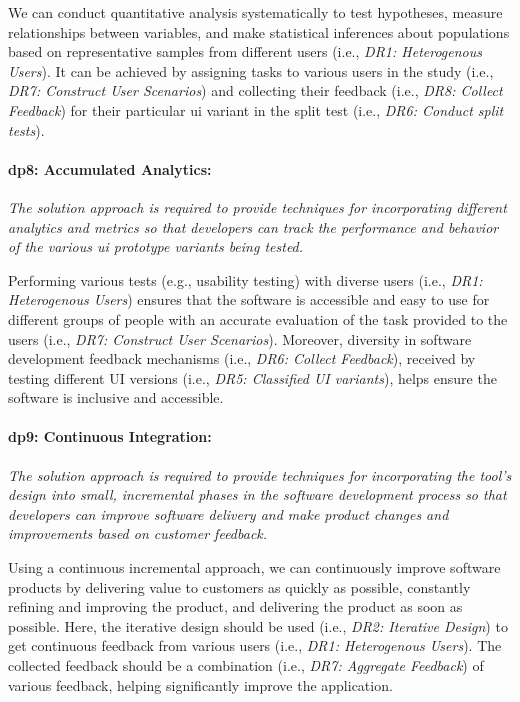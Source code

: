 We can conduct quantitative analysis systematically to test hypotheses, measure relationships between variables, and make statistical inferences about populations based on representative samples from different users (i.e., \textit{DR1: Heterogenous Users}).
It can be achieved by assigning tasks to various users in the study (i.e., \textit{DR7: Construct User Scenarios}) and collecting their feedback (i.e., \textit{DR8: Collect Feedback}) for their particular \ac{ui} variant in the split test (i.e., \textit{DR6: Conduct split tests}).

\paragraph{\ac{dp}8: Accumulated Analytics:} \textit{The solution approach is required to provide techniques for incorporating different analytics and metrics so that developers can track the performance and behavior of the various \ac{ui} prototype variants being tested.}

Performing various tests (e.g., usability testing) with diverse users (i.e., \textit{DR1: Heterogenous Users}) ensures that the software is accessible and easy to use for different groups of people with an accurate evaluation of the task provided to the users (i.e., \textit{DR7: Construct User Scenarios}).
Moreover, diversity in software development feedback mechanisms (i.e., \textit{DR6: Collect Feedback}), received by testing different UI versions (i.e., \textit{DR5: Classified UI variants}), helps ensure the software is inclusive and accessible.

\paragraph{\ac{dp}9: Continuous Integration:} \textit{The solution approach is required to provide techniques for incorporating the tool's design into small, incremental phases in the software development process so that developers can improve software delivery and make product changes and improvements based on customer feedback.}

Using a continuous incremental approach, we can continuously improve software products by delivering value to customers as quickly as possible, constantly refining and improving the product, and delivering the product as soon as possible.
Here, the iterative design should be used (i.e., \textit{DR2: Iterative Design}) to get continuous feedback from various users (i.e., \textit{DR1: Heterogenous Users}).
The collected feedback should be a combination (i.e., \textit{DR7: Aggregate Feedback}) of various feedback, helping significantly improve the application.

